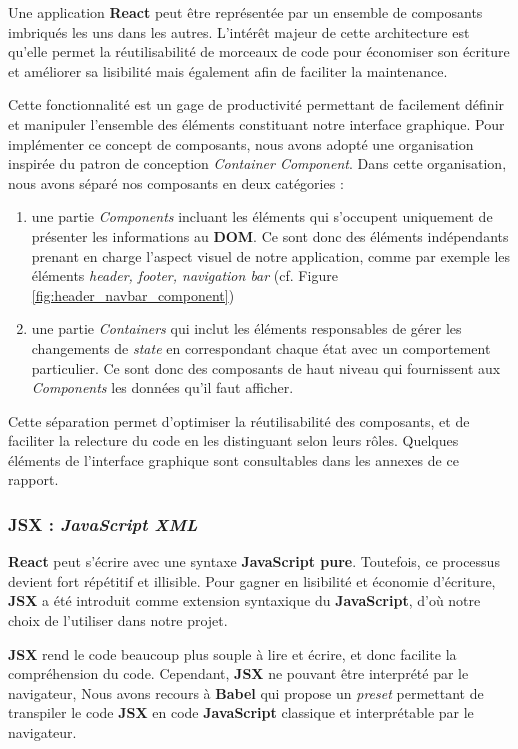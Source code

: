 \documentclass[a4paper,12pt]{report}
\theoremstyle{break}
\theoremstyle{break}
\theoremstyle{break}
\theoremstyle{break}
\theoremstyle{definition}
\theoremstyle{remark}
\begin{document}
Une application \textbf{React} peut être représentée par un ensemble de composants imbriqués les uns dans les autres. L’intérêt majeur de cette architecture est qu’elle permet la réutilisabilité de \og morceaux de code \fg pour économiser son écriture et améliorer sa lisibilité mais également afin de faciliter la maintenance.

Cette fonctionnalité est un gage de productivité permettant de facilement définir et manipuler l’ensemble des éléments constituant notre interface graphique.
Pour implémenter ce concept de composants, nous avons adopté une organisation inspirée du patron de conception \textit{Container Component}. Dans cette organisation, nous avons séparé nos composants en deux catégories :

\begin{enumerate}
  \item une partie \textit{Components} incluant les éléments qui s’occupent uniquement de présenter les informations au \textbf{DOM}. Ce sont donc des éléments indépendants prenant en charge l’aspect visuel de notre application, comme par exemple les éléments \textit{header, footer, navigation bar} (cf. Figure \ref{fig:header_navbar_component})
  \item une partie \textit{Containers} qui inclut les éléments responsables de gérer les changements de \textit{state} en correspondant chaque état avec un comportement particulier. Ce sont donc des composants de haut niveau qui fournissent aux \textit{Components} les données qu’il faut afficher.
\end{enumerate}

Cette séparation permet d'optimiser la réutilisabilité des composants, et de faciliter la relecture du code en les distinguant selon leurs rôles. Quelques éléments de l'interface graphique sont consultables dans les annexes de ce rapport.

\subsubsection{JSX : \textit{JavaScript XML}}
\textbf{React} peut s’écrire avec une syntaxe \textbf{JavaScript pure}. Toutefois, ce processus devient fort répétitif et illisible. Pour gagner en lisibilité et économie d'écriture, \textbf{JSX} a été introduit comme extension syntaxique du \textbf{JavaScript}, d'où notre choix de l'utiliser dans notre projet.

\textbf{JSX} rend le code beaucoup plus souple à lire et écrire, et donc facilite la compréhension du code. Cependant,  \textbf{JSX} ne pouvant être interprété par le navigateur, Nous avons recours à \textbf{Babel}  qui propose un \textit{preset} permettant de transpiler le code \textbf{JSX} en code \textbf{JavaScript} classique et interprétable par le navigateur.
\end{document}

